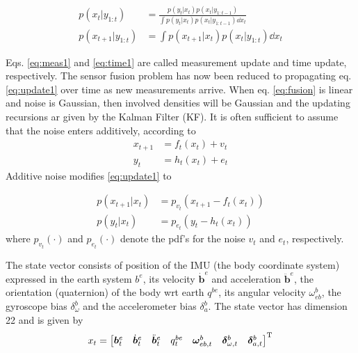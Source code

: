 \begin{subequations}\label{eq:update1}
	\begin{align}
	p ( x_{t} | y_{1:t} ) &= \frac { p ( y_{t} | x_{t} ) p ( x_{t} | y_{1:t-1} ) } { \int p ( y_{t} | x_{t} ) p ( x_{t} | y_{1:t-1} ) \dd{x_{t}} } \label{eq:meas1}\\
	p ( x_{t+1} | y_{1:t} ) &= \int p ( x_{t+1} | x_{t} ) p ( x_{t} | y_{1:t} ) \dd{x_{t}} \label{eq:time1}
	\end{align}
\end{subequations}

Eqs. \ref{eq:meas1} and \ref{eq:time1}  are called measurement update and time update, respectively.  The sensor fusion problem has now been reduced to propagating eq. \ref{eq:update1} over time as new measurements arrive. When eq. \ref{eq:fusion} is linear and noise is Gaussian, then involved densities will be Gaussian and the updating recursions ar given by the Kalman Filter (KF). It is often sufficient to assume that the noise enters additively, according to
\begin{subequations}
	\begin{align}
	x_{t+1} &= f_{t} ( x_{t} ) + v_{t} \\
	y_{t} &= h_{t} ( x_{t} ) + e_{t}
	\end{align}
\end{subequations}
Additive noise modifies \ref{eq:update1} to

\begin{subequations}
	\begin{align}
	p ( x_{t+1} | x_{t} ) &= p_{v_{t}} ( x_{t+1} - f_{t} ( x_{t} ) ) \\
	p ( y_{t} | x_{t} ) &= p_{e_{t}} ( y_{t} - h_{t} ( x_{t} ) )
	\end{align}
\end{subequations}
where $ p_{v_{t}} (\cdot) $ and $ p_{e_{t}} (\cdot) $ denote the pdf's for the noise $ v_{t} $ and $ e_{t} $, respectively.

The state vector consists of position of the IMU (the body coordinate system) expressed in the earth system $ b^{e} $, its velocity $ \dot{\bm{b}}^{e} $ and acceleration $ \ddot{\bm{b}}^{e} $, the orientation (quaternion) of the body wrt earth $ q^{be} $, its angular velocity $ \omega_{eb}^{b} $, the gyroscope bias $ \delta_{\omega}^{b} $ and the accelerometer bias $ \delta_{a}^{b} $. The state vector has dimension 22 and is given by
\begin{equation}\label{eq:state1}
x_{t} = \begin{bmatrix} \bm{b}_{t}^{e} & \dot{\bm{b}}_{t}^{e} & \ddot{\bm{b}}_{t}^{e} & q_{t}^{be} & \bm{\omega}_{eb,t}^{b} & \bm{\delta}_{\omega,t}^{b} & \bm{\delta}_{a,t}^{b} \end{bmatrix} ^\text{T}
\end{equation}

